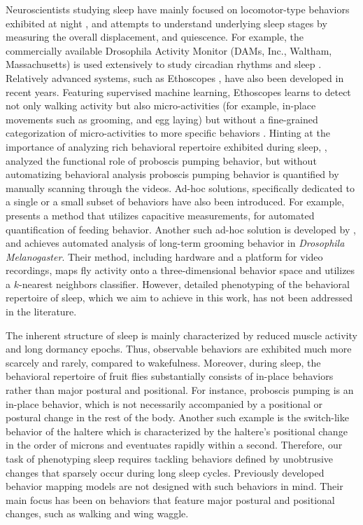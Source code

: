 Neuroscientists studying sleep have mainly focused on locomotor-type behaviors exhibited at night \citep{wiggin_covert_2020, nath_jellyfish_2017}, and attempts to understand underlying sleep stages by measuring the overall displacement, and quiescence.
For example, the commercially available Drosophila Activity Monitor (DAMs, Inc., Waltham, Massachusetts) is used extensively to study circadian rhythms and sleep \citep{pfeiffenberger_processing_2010, pfeiffenberger_locomotor_2010}.
Relatively advanced systems, such as Ethoscopes \citep{geissmann_ethoscopes_2017}, have also been developed in recent years.
Featuring supervised machine learning, Ethoscopes learns to detect not only walking activity but also micro-activities (for example, in-place movements such as grooming, and egg laying) but without a fine-grained categorization of micro-activities to more specific behaviors \citep{geissmann_most_2019}.
Hinting at the importance of analyzing rich behavioral repertoire exhibited during sleep, \citet{van_alphen_deep_2021}, analyzed the functional role of proboscis pumping behavior, but without automatizing behavioral analysis proboscis pumping behavior is quantified by manually scanning through the videos.
Ad-hoc solutions, specifically dedicated to a single or a small subset of behaviors have also been introduced.
For example, \citet{itskov_automated_2014} presents a method that utilizes capacitive measurements, for automated quantification of feeding behavior.
Another such ad-hoc solution is developed by \citet{qiao_automated_2018}, and achieves automated analysis of long-term grooming behavior in \textit{Drosophila Melanogaster}.
Their method, including hardware and a platform for video recordings, maps fly activity onto a three-dimensional behavior space and utilizes a $k$-nearest neighbors classifier.
However, detailed phenotyping of the behavioral repertoire of sleep, which we aim to achieve in this work, has not been addressed in the literature.

The inherent structure of sleep is mainly characterized by reduced muscle activity and long dormancy epochs.
Thus, observable behaviors are exhibited much more scarcely and rarely, compared to wakefulness.
Moreover, during sleep, the behavioral repertoire of fruit flies substantially consists of in-place behaviors rather than major postural and positional.
For instance, proboscis pumping is an in-place behavior, which is not necessarily accompanied by a positional or postural change in the rest of the body.
Another such example is the switch-like behavior of the haltere which is characterized by the haltere's positional change in the order of microns and eventuates rapidly within a second.
Therefore, our task of phenotyping sleep requires tackling behaviors defined by unobtrusive changes that sparsely occur during long sleep cycles.
Previously developed behavior mapping models are not designed with such behaviors in mind.
Their main focus has been on behaviors that feature major postural and positional changes, such as walking and wing waggle.

